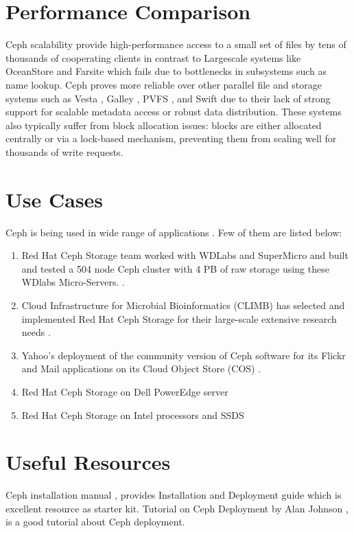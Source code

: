 \documentclass[9pt,twocolumn,twoside]{styles/osajnl}
\begin{document}
\section{Performance Comparison}
Ceph scalability provide high-performance access to a small set of
files by tens of thousands of cooperating clients in contrast to
Largescale systems like OceanStore \cite{paper-oceanstore} and Farsite
\cite{paper-farsite} which fails due to bottlenecks in subsystems such
as name lookup. Ceph proves more reliable over other parallel file and
storage systems such as Vesta \cite{paper-vesta}, Galley
\cite{paper-gallery}, PVFS \cite{mag-pvfs}, and Swift
\cite{report-Swift} due to their lack of strong support for scalable
metadata access or robust data distribution. These systems also
typically suffer from block allocation issues: blocks are either
allocated centrally or via a lock-based mechanism, preventing them
from scaling well for thousands of write requests.

\section{Use Cases}
Ceph is being used in wide range of applications
\cite{www-ceph-usecases}. Few of them are listed below:
\begin{enumerate}
\item Red Hat Ceph Storage team worked with WDLabs and SuperMicro and
  built and tested a 504 node Ceph cluster with 4 PB of raw storage
  using these WDlabs Micro-Servers. \cite{wdlabs-ceph}.
\item Cloud Infrastructure for Microbial Bioinformatics (CLIMB) has
  selected and implemented Red Hat Ceph Storage for their large-scale
  extensive research needs \cite{climb-ceph}.
\item Yahoo's deployment of the community version of Ceph software for
  its Flickr and Mail applications on its Cloud Object Store (COS)
  \cite{yahoo-ceph-deploy}.
\item Red Hat Ceph Storage on Dell PowerEdge server
\item Red Hat Ceph Storage on Intel processors and SSDS
\end{enumerate}

\section{Useful Resources}
Ceph installation manual \cite{www-ceph-install}, provides
Installation and Deployment guide which is excellent resource as
starter kit. Tutorial on Ceph Deployment by Alan
Johnson\cite{ceph-deploy-guide} , is a good tutorial about Ceph
deployment.
\end{document}

